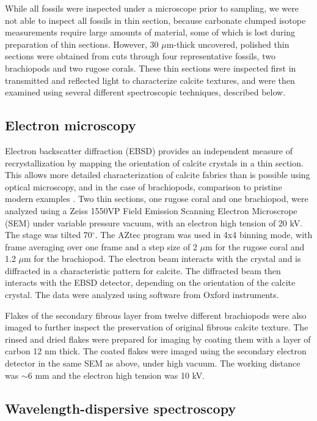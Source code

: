 \documentclass[5p, authoryear]{elsarticle}
\begin{document}
While all fossils were inspected under a microscope prior to sampling, we were not able to inspect all fossils in thin section, because carbonate clumped isotope measurements require large amounts of material, some of which is lost during preparation of thin sections. However, 30 $\mu$m-thick uncovered, polished thin sections were obtained from cuts through four representative fossils, two brachiopods and two rugose corals. These thin sections were inspected first in transmitted and reflected light to characterize calcite textures, and were then examined using several different spectroscopic techniques, described below. 

\subsection{Electron microscopy}

Electron backscatter diffraction (EBSD) provides an independent measure of recrystallization by mapping the orientation of calcite crystals in a thin section. This allows more detailed characterization of calcite fabrics than is possible using optical microscopy, and in the case of brachiopods, comparison to pristine modern examples \citep{PerezHuerta2007}. Two thin sections, one rugose coral and one brachiopod, were analyzed using a Zeiss 1550VP Field Emission Scanning Electron Microscrope (SEM) under variable pressure vacuum, with an electron high tension of 20 kV. The stage was tilted 70$^{\circ}$. The AZtec program was used in 4x4 binning mode, with frame averaging over one frame and a step size of 2 $\mu$m for the rugose coral and 1.2 $\mu$m for the brachiopod. The electron beam interacts with the crystal and is diffracted in a characteristic pattern for calcite. The diffracted beam then interacts with the EBSD detector, depending on the orientation of the calcite crystal. The data were analyzed using software from Oxford instruments.

Flakes of the secondary fibrous layer from twelve different brachiopods were also imaged to further inspect the preservation of original fibrous calcite texture. The rinsed and dried flakes were prepared for imaging by coating them with a layer of carbon 12 nm thick. The coated flakes were imaged using the secondary electron detector in the same SEM as above, under high vacuum. The working distance was $\sim$6 mm and the electron high tension was 10 kV.

\subsection{Wavelength-dispersive spectroscopy}
\end{document}
